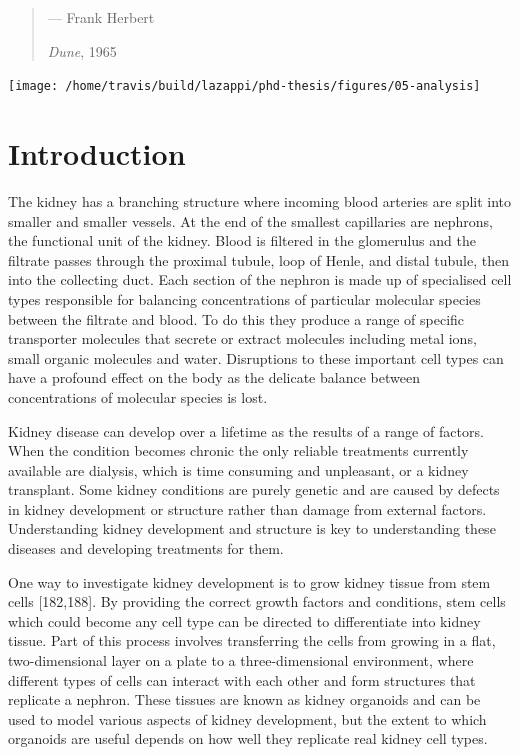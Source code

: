\documentclass[11pt,a4paper,titlepage,twoside,openright]{style/unimelbthesis}
\theoremstyle{definition}
\theoremstyle{definition}
\theoremstyle{definition}
\theoremstyle{remark}
\begin{document}
\begin{mainmatter}
\begin{quote}
--- Frank Herbert

\emph{Dune}, 1965
\end{quote}

\begin{center}\texttt{[image: /home/travis/build/lazappi/phd-thesis/figures/05-analysis]} \end{center}

\clearpage

\hypertarget{introduction-4}{%
\section{Introduction}\label{introduction-4}}

The kidney has a branching structure where incoming blood arteries are split into smaller and smaller vessels. At the end of the smallest capillaries are nephrons, the functional unit of the kidney. Blood is filtered in the glomerulus and the filtrate passes through the proximal tubule, loop of Henle, and distal tubule, then into the collecting duct. Each section of the nephron is made up of specialised cell types responsible for balancing concentrations of particular molecular species between the filtrate and blood. To do this they produce a range of specific transporter molecules that secrete or extract molecules including metal ions, small organic molecules and water. Disruptions to these important cell types can have a profound effect on the body as the delicate balance between concentrations of molecular species is lost.

Kidney disease can develop over a lifetime as the results of a range of factors. When the condition becomes chronic the only reliable treatments currently available are dialysis, which is time consuming and unpleasant, or a kidney transplant. Some kidney conditions are purely genetic and are caused by defects in kidney development or structure rather than damage from external factors. Understanding kidney development and structure is key to understanding these diseases and developing treatments for them.

One way to investigate kidney development is to grow kidney tissue from stem cells {[}182,188{]}. By providing the correct growth factors and conditions, stem cells which could become any cell type can be directed to differentiate into kidney tissue. Part of this process involves transferring the cells from growing in a flat, two-dimensional layer on a plate to a three-dimensional environment, where different types of cells can interact with each other and form structures that replicate a nephron. These tissues are known as kidney organoids and can be used to model various aspects of kidney development, but the extent to which organoids are useful depends on how well they replicate real kidney cell types.


\end{mainmatter}
\end{document}

